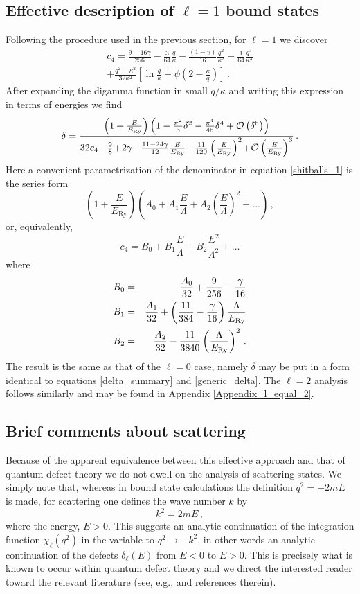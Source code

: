 \documentclass[pra,twocolumn,nofootinbib, superscriptaddress]{revtex4}%
\def\ssec#1{\subsection{#1} }
\def\({\left(}
\def\){\right)}
\def\[{\left[}
\def\]{\right]}
\def\f#1#2{\frac{#1}{#2}}
\def\g{\gamma}
\def\de{\delta}
\def\k{\kappa}
\def\L{\Lambda}
\def\p{\pi}
\begin{document}
\ssec{Effective description of $\ell=1$ bound states}

Following the procedure used in the previous section, for $\ell=1$ we discover
\begin{multline}
c_4=\f{9-16\g}{256} -\f{3}{64}\f{q}{\k} -\f{\(1-\g\)}{16}\f{q^2}{\k^2} + \f{1}{64}\f{q^3}{\k^3}\\
+\f{q^2-\k^2}{32\k^2}\[\ln{\f{q}{\k}}+\psi\(2-\f{\k}{q}\)\]\,.
\end{multline}
After expanding the digamma function in small $q/\k$ and writing this expression in terms of energies we find
\begin{equation}\label{shitballs_1}
\de =\f{\(1+\f{E}{E_\text{Ry}}\)\(1-\f{\p^2}{3}\de^2 -\f{\p^4}{45}\de^4  + {\cal O}\(\de^6\)\)}{32c_4 \!-\! \f{9}{8} \!+\! 2\g \!-\! \f{11-24\g}{12}\f{E}{E_\text{Ry}} \!+\! \f{11}{120} \(\f{E}{E_\text{Ry}}\)^2 \!+\! {\cal O}\(\f{E}{E_\text{Ry}}\)^3}
   \,.
\end{equation}
Here a convenient parametrization of the denominator in equation \eqref{shitballs_1} is the series form
\begin{equation}
\(1+\f{E}{E_\text{Ry}}\)\(A_0 + A_1 \f{E}{\L} + A_2 \(\f{E}{\L}\)^2 +\dots\)\,,
\end{equation}
or, equivalently,
\begin{equation}
c_4 =B_0 + B_1\f{E}{\L}+ B_2\f{E^2}{\L^2} +\dots
\end{equation}
where
\begin{eqnarray}
B_0&=&\f{A_0}{32} + \f{9}{256}-\f{\gamma}{16}\notag\\
B_1&=&\f{A_1}{32} + \(\f{11}{384} - \f{\g}{16}\) \f{\L}{E_\text{Ry}}  \notag\\
B_2&=&\f{A_2}{32} - \f{11}{3840} \(\f{\L}{E_\text{Ry}}\)^2\,.
\end{eqnarray}
The result is the same as that of the $\ell=0$ case, namely $\de$ may be put in a form identical to equations \eqref{delta_summary} and \eqref{generic_delta}. The $\ell=2$ analysis follows similarly and may be found in Appendix \ref{Appendix_l_equal_2}.


\ssec{Brief comments about scattering}

Because of the apparent equivalence between this effective approach and that of quantum defect theory we do not dwell on the analysis of scattering states. We simply note that, whereas in bound state calculations the definition $q^2=-2mE$ is made, for scattering one defines the wave number $k$ by
\begin{equation}
k^2=2mE\,,
\end{equation}
where the energy, $E>0$. This suggests an analytic continuation of the integration function $\chi_\ell(q^2)$ in the variable to $q^2\to -k^2$, in other words an analytic continuation of the defects $\de_\ell(E)$ from $E<0$ to $E>0$. This is precisely what is known to occur within quantum defect theory and we direct the interested reader toward the relevant literature (see, e.g., \cite{Seaton_1983} and references therein).
\end{document}
